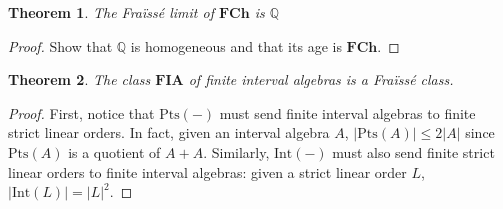 \documentclass[11pt %
              ]{article}
\newcommand{\Q}{\mathbb{Q}}
\newcommand{\finslo}{\textbf{FCh}}
\newcommand{\finaia}{\textbf{FIA}}
\newcommand{\inter}[1][-]{\text{Int}\left(#1\right)}
\newcommand{\points}[1][-]{\text{Pts}\left(#1\right)}
\theoremstyle{plain}
\newtheorem{thm}{Theorem}%
\theoremstyle{definition}
\theoremstyle{remark}
\begin{document}
\begin{thm}
  The Fraïssé limit of $\finslo$ is $\Q$
\end{thm}
\begin{proof}
  Show that $\Q$ is homogeneous and that its age is $\finslo$.
\end{proof}

\begin{thm}
  The class $\finaia$ of finite interval algebras is a Fraïssé class.
\end{thm}
\begin{proof}
  First, notice that $\points$ must send finite interval algebras to finite strict linear orders.
  In fact, given an interval algebra $A$, $|\points[A]| \leq 2|A|$ since 
  $\points[A]$ is a quotient of $A + A$. Similarly, $\inter$ must also send finite strict linear
  orders to finite interval algebras: given a strict linear order $L$, $|\inter[L]| = |L|^2$.


\end{proof}
\end{document}
